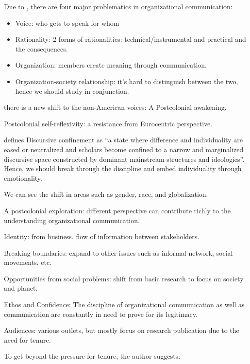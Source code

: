 \documentclass[
]{book}
\providecommand{\tightlist}{%
  \setlength{\itemsep}{0pt}\setlength{\parskip}{0pt}}
\begin{document}
Due to \citep{Mumby_1996}, there are four major problematics in organizational communication:

\begin{itemize}
\tightlist
\item
  Voice: who gets to speak for whom\\
\item
  Rationality: 2 forms of rationalities: technical/instrumental and practical and the consequences.\\
\item
  Organization: members create meaning through communication.\\
\item
  Organization-society relationship: it's hard to distinguish between the two, hence we should study in conjunction.
\end{itemize}

there is a new shift to the non-American voices: A Postcolonial awakening.

Postcolonial self-reflexivity: a resistance from Eurocentric perspective.

\citep{Shome_1996} defines Discursive confinement as ``a state where difference and individuality are eased or neutralized and scholars become confined to a narrow and marginalized discursive space constructed by dominant mainstream structures and ideologies''. Hence, we should break through the discipline and embed individuality through emotionality.

We can see the shift in areas such as gender, race, and globalization.

A postcolonial exploration: different perspective can contribute richly to the understanding organizational communication.

\citep{Cheney_2007}

Identity: from business. flow of information between stakeholders.

Breaking boundaries: expand to other issues such as informal network, social movements, etc.

Opportunities from social problems: shift from basic research to focus on society and planet.

Ethos and Confidence: The discipline of organizational communication as well as communication are constantly in need to prove for its legitimacy.

Audiences: various outlets, but mostly focus on research publication due to the need for tenure.

To get beyond the pressure for tenure, the author suggests:
\end{document}
